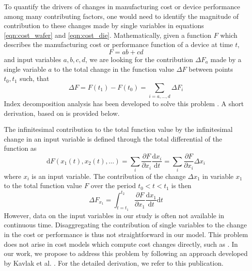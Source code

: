 \documentclass[parskip=full]{article}
\begin{document}
To quantify the drivers of changes in manufacturing cost or device performance among many contributing factors, one would need to identify the magnitude of contribution to these changes made by single variables in equations \cref{eqn:cost_wafer} and \cref{eqn:cost_die}. Mathematically, given a function $F$ which describes the manufacturing cost or performance function of a device at time $t$,
%
\begin{equation}
F=ab+cd
\end{equation}
%
and input variables $a,b,c,d$, we are looking for the contribution $\Delta F_{a}$ made by a single variable $a$ to the total change in the function value $\Delta F$ between points $t_0,t_1$ such, that
%
\begin{equation}
\Delta F = F(t_1)-F(t_0) = \sum_{i=a, \dots, d} \Delta F_i
\end{equation}
%
Index decomposition analysis has been developed to solve this problem \cite{Boyd1987}. A short derivation, based on \cite{kavlak2018evaluating} is provided below.

The infinitesimal contribution to the total function value by the infinitesimal change in an input variable is defined through the total differential of the function as
%
\begin{equation}
\text{d}F(x_1 (t), x_2(t), \dots) = \sum_i \frac{\partial F }{\partial x_i}     \frac{\text{d}x_i}{\text{d}t} = \sum_i \frac{\partial F }{\partial x_i}  \Delta x_i
\end{equation}
%
where $x_i$ is an input variable. The contribution of the change $\Delta x_1$ in variable $x_1$ to the total function value $F$ over the period $t_0 < t < t_1 $ is then
%
\begin{equation}
\Delta F_{x_1} = \int_{t=t_1}^{t_2} \frac{\partial F }{\partial x_1} \frac{\text{d}x_1}{\text{d}t} \text{d}t
\label{eqn:integral_1}
\end{equation}
%
However, data on the input variables in our study is often not available in continuous time. Disaggregating the contribution of single variables to the change in the cost or performance is thus not straightforward in our model. This problem does not arise in cost models which compute cost changes directly, such as \cite{nemet2012solar} \cite{goodrich2013assessing}. In our work, we propose to address this problem by following an approach developed by Kavlak et al. \cite{kavlak2018evaluating}. For the detailed derivation, we refer to this publication.
\end{document}
